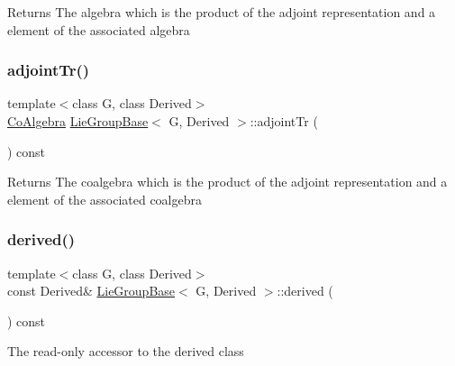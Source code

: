 \begin{DoxyReturn}{Returns}
The algebra which is the product of the adjoint representation and a element of the associated algebra 
\end{DoxyReturn}
\hypertarget{class_lie_group_base_aa83ed8fa7640b9c76969b179ee608317}{}\label{class_lie_group_base_aa83ed8fa7640b9c76969b179ee608317} 
\subsubsection{\texorpdfstring{adjoint\+Tr()}{adjointTr()}}
{\footnotesize\ttfamily template$<$class G, class Derived$>$ \\
\hyperlink{class_lie_group_base_a7d87259a140110af06f8bca9933b878d}{Co\+Algebra} \hyperlink{class_lie_group_base}{Lie\+Group\+Base}$<$ G, Derived $>$\+::adjoint\+Tr (\begin{DoxyParamCaption}\item[{const \hyperlink{class_lie_group_base_a7d87259a140110af06f8bca9933b878d}{Co\+Algebra} \&}]{ }\end{DoxyParamCaption}) const}

\begin{DoxyReturn}{Returns}
The coalgebra which is the product of the adjoint representation and a element of the associated coalgebra 
\end{DoxyReturn}
\hypertarget{class_lie_group_base_a26dd47c7d6ea848a03490f7f4ddc119e}{}\label{class_lie_group_base_a26dd47c7d6ea848a03490f7f4ddc119e} 
\subsubsection{\texorpdfstring{derived()}{derived()}\hspace{0.1cm}{\footnotesize\ttfamily [1/2]}}
{\footnotesize\ttfamily template$<$class G, class Derived$>$ \\
const Derived\& \hyperlink{class_lie_group_base}{Lie\+Group\+Base}$<$ G, Derived $>$\+::derived (\begin{DoxyParamCaption}{ }\end{DoxyParamCaption}) const\hspace{0.3cm}{\ttfamily [inline]}}

The read-\/only accessor to the derived class 

